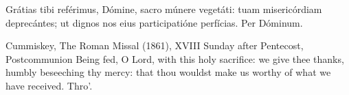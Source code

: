 
\begin{latinproper}
Grátias tibi reférimus, Dómine, sacro múnere vegetáti: tuam misericórdiam
deprecántes; ut dignos nos eius participatióne perfícias. Per Dóminum.
\end{latinproper}

\begin{englishwitness}{Cummiskey, The Roman Missal (1861), XVIII Sunday after Pentecost, Postcommunion}
Being fed, O Lord, with this holy sacrifice: we give thee thanks, humbly
beseeching thy mercy: that thou wouldst make us worthy of what we have
received. Thro'.
\end{englishwitness}
